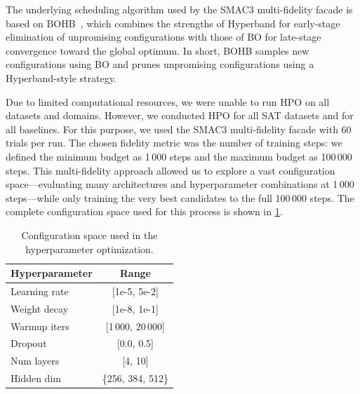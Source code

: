 The underlying scheduling algorithm used by the \textsc{SMAC3} multi-fidelity facade is based on BOHB~\citep{FalEtAl18}, which combines the strengths of Hyperband for early-stage elimination of unpromising configurations with those of BO for late-stage convergence toward the global optimum. In short, BOHB samples new configurations using BO and prunes unpromising configurations using a Hyperband-style strategy.

Due to limited computational resources, we were unable to run HPO on all datasets and domains. However, we conducted HPO for all SAT datasets and for all baselines. For this purpose, we used the \textsc{SMAC3} multi-fidelity facade with 60 trials per run. The chosen fidelity metric was the number of training steps: we defined the minimum budget as 1\,000 steps and the maximum budget as 100\,000 steps. This multi-fidelity approach allowed us to explore a vast configuration space---evaluating many architectures and hyperparameter combinations at 1\,000 steps---while only training the very best candidates to the full 100\,000 steps. The complete configuration space used for this process is shown in \cref{tab:ch06:hpo_cs}.

\begin{table}[htbp]
\centering
\caption{Configuration space used in the hyperparameter optimization.}


\label{tab:ch06:hpo_cs}
\begin{tabular}{lc}
\toprule
\textbf{Hyperparameter} & \textbf{Range} \\

\midrule

Learning rate & [1e-5, 5e-2] \\
Weight decay & [1e-8, 1e-1]  \\
Warmup iters & [1\,000, 20\,000] \\
Dropout & [0.0, 0.5]\\
Num layers & [4, 10]\\
Hidden dim & \{256, 384, 512\}\\

\bottomrule
\end{tabular}

\end{table}


